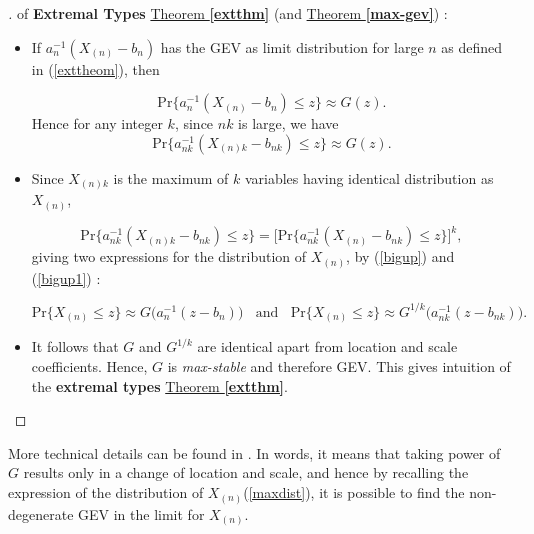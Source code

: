 \begin{proof}[\nopunct ] of \textbf{Extremal Types} \hyperref[extthm]{Theorem \textbf{\ref{extthm}}} (and \hyperref[max-gev]{Theorem \textbf{\ref{max-gev}}}) :
	\vspace{-0.1cm}
\ \ \	\begin{itemize}
    \item	If $a_n^{-1}(X_{(n)}-b_n)$ has the GEV as limit distribution for large $n$ as defined in (\ref{exttheom}), then
	
	\begin{equation*} \label{gevproof1}
	\text{Pr}\Big\{ a_n^{-1}(X_{(n)}-b_n)\leq z\Big\}\approx G(z).
	\end{equation*}
	Hence for any integer $k$, since $nk$ is large, we have
	\begin{equation} \label{bigup}
	\text{Pr}\Big\{ a_{nk}^{-1}(X_{(n)k}-b_{nk})\leq z\Big\}\approx G(z).
	\end{equation}
	
	\item Since $X_{(n)k}$ is the maximum of $k$ variables having identical distribution as $X_{(n)}$,
	
	\begin{equation} \label{bigup1}
	\text{Pr}\Big\{ a_{nk}^{-1}(X_{(n)k}-b_{nk})\leq z\Big\}=\Big[\text{Pr}\big\{ a_{nk}^{-1}(X_{(n)}-b_{nk})\leq z\big\}\Big]^k,
	\end{equation}
	giving two expressions for the distribution of $X_{(n)}$, by (\ref{bigup}) and (\ref{bigup1}) :
	
	\begin{equation*}\label{gevproofl}
	\text{Pr}\{X_{(n)}\leq z\}\approx G\Big(a_n^{-1}(z-b_n)\Big) \ \ \ \ \text{and} \ \ \ \ \text{Pr}\{X_{(n)}\leq z\} \approx G^{1/k}\Big(a_{nk}^{-1}(z-b_{nk})\Big).
	\end{equation*}
	\item It follows that $G$ and $G^{1/k}$ are identical apart from location and scale coefficients. 
	Hence, $G$ is \emph{max-stable} and therefore GEV. This gives intuition of the \textbf{extremal 
	types} \hyperref[extthm]{Theorem \textbf{\ref{extthm}}}.
  \end{itemize}
\vspace{-.3cm}
\end{proof}

More technical details can be found in \citet{leadbetter_extremes_1983}. In words, it means that taking power of $G$ results only in a change of location and scale, and hence by recalling the expression of the distribution of $X_{(n)}$(\ref{maxdist}), it is possible to find the non-degenerate GEV in the limit for $X_{(n)}$.

